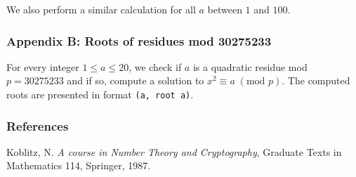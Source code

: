 \documentclass[12pt]{article}
\newcommand{\textmod}[1]{\;(\text{mod }#1)}
\begin{document}
We also perform a similar calculation for all \(a\) between \(1\) and \(100\).

 

\subsubsection*{Appendix B: Roots of residues mod 30275233}
For every integer \(1\leq a\leq 20\), we check if \(a\) is a quadratic residue
mod \(p=30275233\) and if so, compute a solution to \(x^2\equiv a\textmod{p}\).
The computed roots are presented in format \texttt{(a, root a)}.

 

\subsubsection*{References}
\begin{enumerate}[{[}1{]}]
    \item Koblitz, N. \textit{A course in Number Theory and Cryptography},
        Graduate Texts in Mathematics 114, Springer, 1987.
\end{enumerate}
\end{document}
